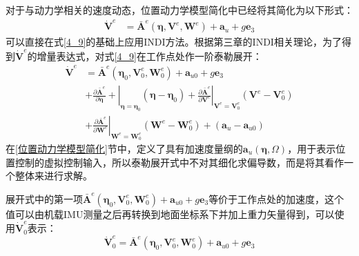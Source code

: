 对于与动力学相关的速度动态，位置动力学模型简化中已经将其简化为以下形式：
\begin{equation}
    \begin{aligned}
        \dot{\boldsymbol{V}}^e&=
        {\boldsymbol{\bar A}}^e(\boldsymbol{\eta},\boldsymbol{V}^e,\boldsymbol{W}^e)+\boldsymbol{a}_u+g\boldsymbol{e}_3
    \end{aligned}
    \label{4_9}
\end{equation}
可以直接在式\eqref{4_9}的基础上应用INDI方法。根据第三章的INDI相关理论，为了得到$\boldsymbol{\dot{V}}^e$的增量表达式，对式\eqref{4_9}在工作点处作一阶泰勒展开：
\begin{equation}
    \begin{aligned}
        \boldsymbol{\dot{V}}^e&={\boldsymbol{\bar A}}^e(\boldsymbol{\eta}_0,\boldsymbol{V}^e_0,\boldsymbol{W}^e_0)+\boldsymbol{a}_{u0}+g\boldsymbol{e}_3\\
        &+\left.\frac{\partial {\boldsymbol{\bar A}}^e}{\partial\boldsymbol{\eta}}+\right|_{\boldsymbol{\eta}=\boldsymbol{\eta}_0}
        (\boldsymbol{\eta}-\boldsymbol{\eta}_0)+\left.\frac{\partial {\boldsymbol{\bar A}}^e}{\partial\boldsymbol{V}^e}\right|_{\boldsymbol{V}^e=\boldsymbol{V}^e_0}
        (\boldsymbol{V}^e-\boldsymbol{V}^e_0)\\
        &+\left.\frac{\partial {\boldsymbol{\bar A}}^e}{\partial\boldsymbol{W}^e}\right|_{\boldsymbol{W}^e=\boldsymbol{W}^e_0}(\boldsymbol{W}^e-\boldsymbol{W}^e_0)+(\boldsymbol{a}_{u}-\boldsymbol{a}_{u0})
    \end{aligned}
    \label{4_10}
\end{equation}
在\ref{位置动力学模型简化}节中，定义了具有加速度量纲的$\boldsymbol{a}_u(\boldsymbol{\eta},\Omega)$，用于表示位置控制的虚拟控制输入，所以泰勒展开式中不对其细化求偏导数，而是将其看作一个整体来进行求解。

展开式中的第一项${\boldsymbol{\bar A}}^e(\boldsymbol{\eta}_0,\boldsymbol{V}^e_0,\boldsymbol{W}^e_0)+\boldsymbol{a}_{u0}+g\boldsymbol{e}_3$等价于工作点处的加速度，这个值可以由机载IMU测量之后再转换到地面坐标系下并加上重力矢量得到，可以使用$\dot{\boldsymbol{V}}^e_0$表示：
\begin{equation}
        \dot{\boldsymbol{V}}^e_0={\boldsymbol{\bar A}}^e(\boldsymbol{\eta}_0,\boldsymbol{V}^e_0,\boldsymbol{W}^e_0)+\boldsymbol{a}_{u0}+g\boldsymbol{e}_3
    \label{4_11}
\end{equation}

